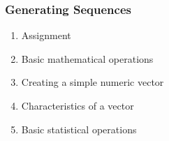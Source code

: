 \begin{frame}
\frametitle{Generating Sequences}

\begin{enumerate}
\item Assignment 
\item Basic mathematical operations
\item Creating a simple numeric vector
\item Characteristics of a vector
\item Basic statistical operations
\end{enumerate}
\end{frame}





